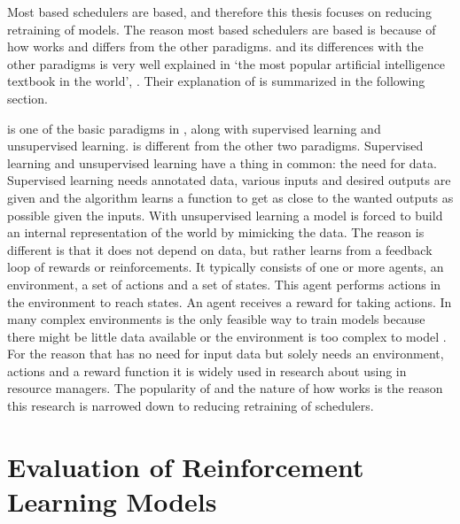 Most \ml based schedulers are \rl based, and therefore this thesis focuses on
reducing retraining of \rl models. The reason most \ml based schedulers are
\rl based is because of how \rl works and differs from the other \ml
paradigms. \rl and its differences with the other paradigms is very well
explained in `the most popular artificial intelligence textbook in the
world'\footnotemark, . Their explanation of \rl is
summarized in the following section.


\rl is one of the basic paradigms in \ml, along with supervised learning and
unsupervised learning. \rl is different from the other two paradigms.
Supervised learning and unsupervised learning have a thing in common: the need
for data. Supervised learning needs annotated data, various inputs and desired
outputs are given and the algorithm learns a function to get as close to the
wanted outputs as possible given the inputs. With unsupervised learning a
model is forced to build an internal representation of the world by mimicking
the data. The reason \rl is different is that it does not depend on data, but
rather learns from a feedback loop of rewards or reinforcements. It typically
consists of one or more agents, an environment, a set of actions and a set of
states. This agent performs actions in the environment to reach states. An
agent receives a reward for taking actions. In many complex environments \rl
is the only feasible way to train models because there might be little data
available or the environment is too complex to model \cite{russell2010}. For
the reason that \rl has no need for input data but solely needs an
environment, actions and a reward function it is widely used in research about
using \ai in resource managers. The popularity of \rl and the nature of how
\rl works is the reason this research is narrowed down to reducing retraining
of \rl schedulers.



\section{Evaluation of Reinforcement Learning Models}


